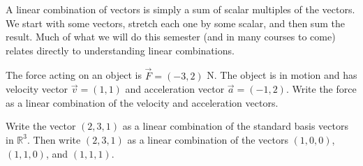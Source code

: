 A linear combination of vectors is simply a sum of scalar multiples of the vectors. 
We start with some vectors, stretch each one by some scalar, and then sum the result. 
Much of what we will do this semester (and in many courses to come) relates directly to understanding linear combinations.  

\begin{problem}
 The force acting on an object is $\vec F = (-3,2)$ N. The object is in motion and has velocity vector $\vec v=(1,1)$ and acceleration vector $\vec a = (-1,2)$.  Write the force as a linear combination of the velocity and acceleration vectors. 
\end{problem}

\begin{problem}
 Write the vector $(2,3,1)$ as a linear combination of the standard basis vectors in $\mathbb{R}^3$.  Then write $(2,3,1)$ as a linear combination of the vectors $(1,0,0)$, $(1,1,0)$, and $(1,1,1)$.  
\end{problem}


